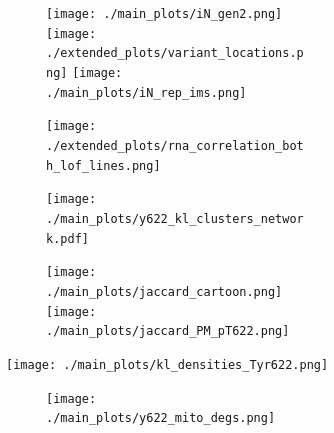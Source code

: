 \documentclass[12pt]{article}
\begin{document}
\begin{figure}[H]


    \begin{subfigure}[t]{.24\textwidth}
        \begin{subfigure}[t]{\textwidth}
            \caption{}
            \texttt{[image: ./main\_plots/iN\_gen2.png]}        
            \texttt{[image: ./extended\_plots/variant\_locations.png]}        
            \texttt{[image: ./main\_plots/iN\_rep\_ims.png]}        
        \end{subfigure} 
        \begin{subfigure}[t]{\textwidth}
            \caption{}
            \texttt{[image: ./extended\_plots/rna\_correlation\_both\_lof\_lines.png]}        
        \end{subfigure} 
    \end{subfigure} 
    \hspace{.5cm}
    \begin{subfigure}[t]{.23\textwidth}
        \begin{subfigure}[t]{\textwidth}
            \caption{}
            \texttt{[image: ./main\_plots/y622\_kl\_clusters\_network.pdf]}        
        \end{subfigure}
        \begin{subfigure}[t]{\textwidth}
            \caption{}
            \centering
            \texttt{[image: ./main\_plots/jaccard\_cartoon.png]}        
            \texttt{[image: ./main\_plots/jaccard\_PM\_pT622.png]}        
        \end{subfigure}  
    \end{subfigure} 
    \hspace{.25cm}
    \begin{subfigure}[t]{.45\textwidth}
        \caption{}
        \texttt{[image: ./main\_plots/kl\_densities\_Tyr622.png]}        
    \end{subfigure}  
\vspace{.25cm}
    \begin{subfigure}[t]{.25\textwidth}
        \begin{subfigure}[t]{\textwidth}
            \caption{}
            \texttt{[image: ./main\_plots/y622\_mito\_degs.png]}        
        \end{subfigure}  
    \end{subfigure} 
    \begin{subfigure}[t]{.2\textwidth}
        \caption{}

\end{subfigure}
\end{figure}
\end{document}
